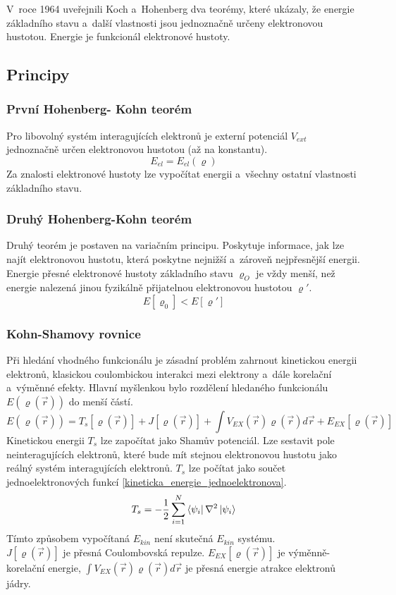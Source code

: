 \documentclass[
  printed, %
  table,   %
  lof,     %
  lot,     %
  oneside,
]{fithesis3}
\begin{document}
V~roce 1964 uveřejnili Koch a~Hohenberg dva teorémy, které ukázaly, že energie základního stavu  a~další vlastnosti jsou jednoznačně určeny elektronovou hustotou. Energie je funkcionál elektronové hustoty.\cite{lechamolecularmodeling}
\subsection{Principy}
\subsubsection{První Hohenberg- Kohn teorém}
Pro libovolný systém interagujících elektronů je externí potenciál $V_{ext}$ jednoznačně
určen elektronovou hustotou (až na konstantu). \cite{dftshrnutivysledky}
\begin{equation}
E_{el} = E_{el} (\varrho)
\end{equation}
 Za znalosti elektronové hustoty lze vypočítat energii a~všechny ostatní vlastnosti základního stavu.
\subsubsection{Druhý Hohenberg-Kohn teorém}
Druhý teorém je postaven na variačním principu. Poskytuje informace, jak lze najít elektronovou hustotu, která poskytne nejnižší a~zároveň nejpřesnější energii.
\cite{koch2000chemist} 
Energie přesné elektronové hustoty základního stavu $\varrho_O$ je vždy menší, než energie nalezená jinou fyzikálně přijatelnou elektronovou hustotou $\varrho'$.\cite{Semradthesis}
\begin{equation}
E [\varrho_0] < E[\varrho ']
\end{equation}

\subsubsection{Kohn-Shamovy rovnice}
Při hledání vhodného funkcionálu je zásadní problém zahrnout kinetickou energii elektronů, klasickou coulombickou interakci mezi elektrony a~dále korelační a~výměnné efekty. Hlavní myšlenkou bylo rozdělení hledaného funkcionálu $E(\varrho(\vec{r}))$ do menší částí. \cite{koch2000chemist}
\begin{equation}
E(\varrho(\vec{r})) = T_s[\varrho(\vec{r})] + J[\varrho(\vec{r})] + \int V_{EX}(\vec{r})\varrho(\vec{r})d\vec{r} + E_{EX}[\varrho(\vec{r})]
\end{equation}
 Kinetickou energii $T_s$ lze započítat jako Shamův potenciál. Lze sestavit pole neinteragujících elektronů, které bude mít stejnou elektronovou hustotu jako reálný systém interagujících elektronů. $T_{s}$ lze počítat jako součet jednoelektronových funkcí \ref{kineticka_energie_jednoelektronova}. \cite{koch2000chemist}
\begin{equation}
T_s = -\frac{1}{2} \sum_{i=1} ^{N}  \bra{\psi_i}{\nabla^{2}}\ket{\psi_i}
\label{kineticka_energie_jednoelektronova}
\end{equation}
Tímto způsobem vypočítaná $E_{kin}$ není skutečná $E_{kin}$ systému. \\
$J[\varrho(\vec{r})]$ je přesná Coulombovská repulze. $E_{EX}[\varrho(\vec{r})]$ je výměnně-korelační energie, $\int V_{EX}(\vec{r})\varrho(\vec{r})d\vec{r}$ je přesná energie atrakce elektronů jádry.
\end{document}
